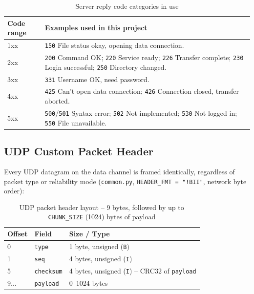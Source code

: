 \documentclass[11pt]{article}
\begin{document}
\begin{table}[htbp]
\centering
\caption{Server reply code categories in use}
\label{tab:reply-codes}
\begin{tabular}{@{}lp{10.5cm}@{}}
\toprule
\textbf{Code range} & \textbf{Examples used in this project} \\
\midrule
1xx & \texttt{150} File status okay, opening data connection. \\
2xx & \texttt{200} Command OK; \texttt{220} Service ready; \texttt{226} Transfer complete;
      \texttt{230} Login successful; \texttt{250} Directory changed. \\
3xx & \texttt{331} Username OK, need password. \\
4xx & \texttt{425} Can't open data connection; \texttt{426} Connection closed, transfer aborted. \\
5xx & \texttt{500}/\texttt{501} Syntax error; \texttt{502} Not implemented;
      \texttt{530} Not logged in; \texttt{550} File unavailable. \\
\bottomrule
\end{tabular}
\end{table}

\subsection{UDP Custom Packet Header}

Every UDP datagram on the data channel is framed identically, regardless of packet
type or reliability mode (\texttt{common.py}, \texttt{HEADER\_FMT = "!BII"}, network
byte order):

\begin{table}[htbp]
\centering
\caption{UDP packet header layout -- 9 bytes, followed by up to \texttt{CHUNK\_SIZE}
         (1024) bytes of payload}
\label{tab:udp-header}
\begin{tabular}{@{}lll@{}}
\toprule
\textbf{Offset} & \textbf{Field} & \textbf{Size / Type} \\
\midrule
0       & \texttt{type}     & 1 byte, unsigned (\texttt{B}) \\
1       & \texttt{seq}      & 4 bytes, unsigned (\texttt{I}) \\
5       & \texttt{checksum} & 4 bytes, unsigned (\texttt{I}) -- CRC32 of \texttt{payload} \\
9$\ldots$ & \texttt{payload} & 0--1024 bytes \\
\bottomrule
\end{tabular}
\end{table}
\end{document}
